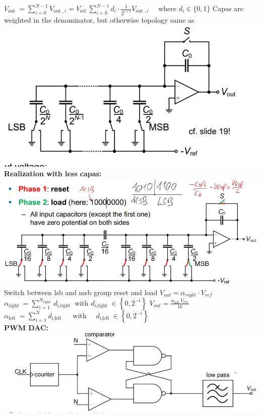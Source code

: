 \documentclass[5pt,landscape]{article}
\begin{document}
\begin{multicols*}{5}
$ V_{\text {out }}=\sum_{i=0}^{N-1} V_{\text {out }, i}=V_{\text {ref }} \sum_{i=0}^{N-1} d_{i} \cdot \frac{1}{2^{i+1}} V_{\text {out }, i} \quad \text { where } d_{i} \in\{0,1\} $
Capas are weighted in the denominator, but otherwise topology same as 
\includegraphics[width=\columnwidth]{images/dac_capa_volt_div.png}
\textbf{Realization with less capas:}\\
\includegraphics[width=\columnwidth]{images/dac_less_capa.png}\\
Switch between lsb and msb group reset and load
$ V_{out} = \alpha_{right} \cdot V_{ref} $
$ \alpha_{\text {right }}=\sum_{i=1}^{N_{\text {right }}} d_{\text {i,right }} \text { with } d_{\text {i,right }} \in\left\{0,2^{-i}\right\} $
$ V_{out} =\frac{\alpha_{\text {left }} V_{\text {ref }}}{16} $\\
$ \alpha_{\text {left }}=\sum_{i=1}^{N} d_{\text {i,left }} \quad \text { with } \quad d_{\text {i,left }} \in\left\{0,2^{-i}\right\} $\\
\textbf{PWM DAC:}\\
\includegraphics[width=\columnwidth]{images/dac_pwm.png}\\

\end{multicols*}
\end{document}
